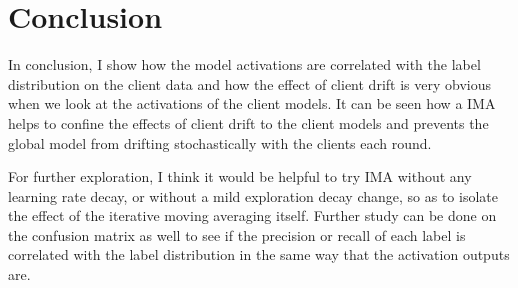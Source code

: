 \documentclass{article}
\begin{document}
\section{Conclusion}

In conclusion, I show how the model activations are correlated with the label distribution on the client data and how the effect of client drift is very obvious when we look at the activations of the client models. It can be seen how a IMA helps to confine the effects of client drift to the client models and prevents the global model from drifting stochastically with the clients each round.

For further exploration, I think it would be helpful to try IMA without any learning rate decay, or without a mild exploration decay change, so as to isolate the effect of the iterative moving averaging itself. Further study can be done on the confusion matrix as well to see if the precision or recall of each label is correlated with the label distribution in the same way that the activation outputs are.





\appendix
\end{document}
